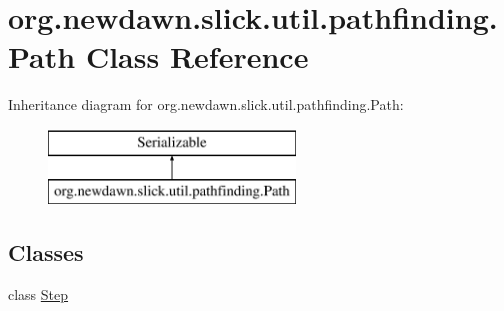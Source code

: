 \hypertarget{classorg_1_1newdawn_1_1slick_1_1util_1_1pathfinding_1_1_path}{}\section{org.\+newdawn.\+slick.\+util.\+pathfinding.\+Path Class Reference}
\label{classorg_1_1newdawn_1_1slick_1_1util_1_1pathfinding_1_1_path}
Inheritance diagram for org.\+newdawn.\+slick.\+util.\+pathfinding.\+Path\+:\begin{figure}[H]
\begin{center}
\leavevmode
\includegraphics[height=2.000000cm]{classorg_1_1newdawn_1_1slick_1_1util_1_1pathfinding_1_1_path}
\end{center}
\end{figure}
\subsection*{Classes}
\begin{DoxyCompactItemize}
\item 
class \mbox{\hyperlink{classorg_1_1newdawn_1_1slick_1_1util_1_1pathfinding_1_1_path_1_1_step}{Step}}
\end{DoxyCompactItemize}

